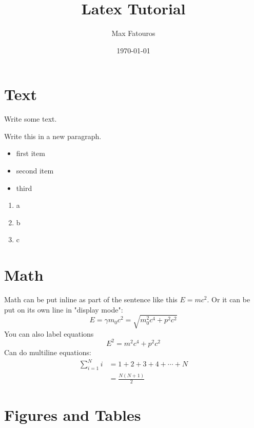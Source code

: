 \documentclass[12pt]{report}
\title{Latex Tutorial}
\author{Max Fatouros}
\date{\today}
\begin{document}
\maketitle

\tableofcontents
\newpage


\section{Text}\label{sec:text}
    Write some text.

    Write this in a new paragraph.

    
    \begin{itemize}
        \item first item
        \item second item
        \item third
    \end{itemize}

    \begin{enumerate}
        \item a
        \item b
        \item c
    \end{enumerate}


\section{Math}\label{sec:math}
    Math can be put inline as part of the sentence like this $E = mc^2$. Or it can be put on its own line in "display mode":
    \[
        E = \gamma m_0c^2 = \sqrt{m_0^2c^4 + p^2c^2}
    \]
    You can also label equations
    \begin{equation}\label{eq:energy-momentum}
        E^2 = m^2c^4 + p^2c^2
    \end{equation}
    Can do multiline equations:
    \begin{align*}
        \sum^N_{i=1} i &= 1 + 2 + 3 + 4 + \cdots + N\\
                       &= \frac{N(N+1)}{2}
    \end{align*}

\section{Figures and Tables}
    \lipsum[1]
    
\end{document}
